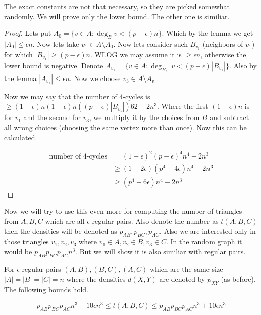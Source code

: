 The exact constants are not that necessary, so they are picked somewhat randomly. We will prove only the lower bound. The other one is similiar.

\begin{proof}
	Lets put $A_{0} = \{ v \in A : \deg_{B} v < (p - \epsilon) n\}$. Which by the lemma we get $|A_{0}| \leq \epsilon n$. Now lets take $v_1 \in A \setminus A_{0}$. Now lets consider such $B_{v_1}$ (neighbors of $v_1$) for which $|B_{v_1}| \geq (p - \epsilon) n$. WLOG we may assume it is $\ge \epsilon n$, otherwise the lower bound is negative. Denote $A_{v_1} = \{v \in A  : \deg_{B_{v_1}} v < (p - \epsilon) |B_{v_1}|\}$. Also by the lemma $|A_{v_1}| \leq \epsilon n$. Now we choose $v_3 \in A \setminus A_{v_1}$.
	
	Now we may say that the number of 4-cycles is $\geq (1-\epsilon)n (1 - \epsilon)n ((p - \epsilon) |B_{v_1}|)62 - 2n^3$. Where the first $(1-\epsilon)n$ is for $v_1$ and the second for $v_3$, we multiply it by the choices from $B$ and subtract all wrong choices (choosing the same vertex more than once). Now this can be calculated.
	
	$$
	\begin{aligned}
		\text{number of 4-cycles} & = (1- \epsilon)^2 (p - \epsilon)^4 n^4 - 2n^3 \\
		&\geq (1-2\epsilon) (p^4 - 4\epsilon) n^4 - 2n^3 \\
		&\geq (p^4 - 6\epsilon) n^4 - 2n^3
	\end{aligned}
	$$
\end{proof}

Now we will try to use this even more for computing the number of triangles from $A,B,C$ which are all $\epsilon$-regular pairs. Also denote the number as $t(A,B,C)$ then the densities will be denoted as $p_{AB}, p_{BC}, p_{AC}$. Also we are interested only in those triangles $v_1, v_2, v_3$ where $v_1 \in A, v_2 \in B, v_3 \in C$. In the random graph it would be $p_{AB} p_{BC} p_{AC} n^3$. But we will show it is also similiar with regular pairs.

\begin{lemma}
	For $\epsilon$-regular pairs $(A,B), (B,C), (A,C)$ which are the same size $|A| = |B| = |C| = n$ where the densities $d(X,Y)$ are denoted by $p_{XY}$ (as before). The following bounds hold.
	
	$$
	p_{AB} p_{BC} p_{AC} n^3 - 10 \epsilon n^3 \leq t(A,B,C) \leq p_{AB} p_{BC} p_{AC} n^3 + 10 \epsilon n^3
	$$
\end{lemma}

